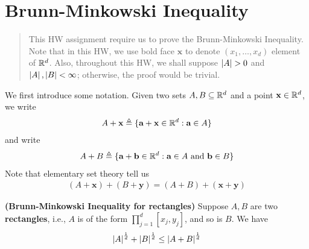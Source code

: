 \documentclass{report}
\begin{document}
\section{Brunn-Minkowski Inequality}
\begin{abstract}
  This HW assignment require us to prove the Brunn-Minkowski Inequality. Note that in this HW, we use bold face $\textbf{x}$ to denote $(x_1,\dots ,x_d)$ element of $\mathbb{R}^d$. Also, throughout this HW, we shall suppose $\abso{A}>0$ and $\left|A\right|,\left|B\right|<\infty$; otherwise, the proof would be trivial. 
\end{abstract}
\begin{mdframed}
  We first introduce some notation. Given two sets $A,B\subseteq \mathbb{R}^d$ and a point $\textbf{x}\in\mathbb{R}^d$, we write 
\begin{align*}
A+\textbf{x}\triangleq \{ \textbf{a}+\textbf{x}\in\mathbb{R}^d: \textbf{a} \in A \}
\end{align*}
and write 
\begin{align*}
A+B \triangleq \{ \textbf{a}+\textbf{b} \in\mathbb{R}^d: \textbf{a}\in A\text{ and }\textbf{b} \in  B \}
\end{align*}
Note that elementary set theory tell us 
\begin{align}
\label{trans}
  (A+\textbf{x})+(B+\textbf{y})=(A+B)+(\textbf{x}+\textbf{y})
\end{align}
\end{mdframed}
\begin{theorem}
\label{Brunn-Minkowski Inequality for Bricks}
\textbf{(Brunn-Minkowski Inequality for rectangles)} Suppose $A,B$ are two  \textbf{rectangles}, i.e., $A$ is of the form $\prod_{j=1}^d[x_j,y_j]$, and so is $B$. We have 
\begin{align*}
\left|A\right|^{\frac{1}{d}}+ \left|B\right|^{\frac{1}{d}}\leq \left|A+B\right|^{\frac{1}{d}}
\end{align*}
\end{theorem}
\end{document}
